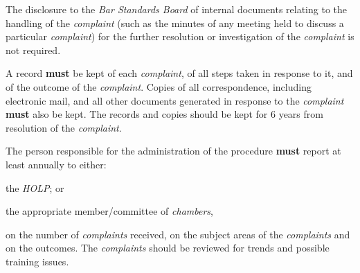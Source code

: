 
The disclosure to the \emph{Bar Standards Board} of internal documents
relating to the handling of the \emph{complaint} (such as the minutes of
any meeting held to discuss a particular \emph{complaint}) for the
further resolution or investigation of the \emph{complaint} is not
required.


A record \textcolor{myred}{\textbf{must}} be kept of each \emph{complaint}, of all steps taken in
response to it, and of the outcome of the \emph{complaint}. Copies of
all correspondence, including electronic mail, and all other documents
generated in response to the \emph{complaint} \textcolor{myred}{\textbf{must}} also be kept. The
records and copies should be kept for 6 years from resolution of the
\emph{complaint}.


The person responsible for the administration of the procedure \textcolor{myred}{\textbf{must}}
report at least annually to either:
\begin{numlist}\item the \emph{HOLP}; or
\item the appropriate member/committee of \emph{chambers},\end{numlist}
on the number of \emph{complaints} received, on the subject areas of the
\emph{complaints} and on the outcomes. The \emph{complaints} should be
reviewed for trends and possible training issues.




